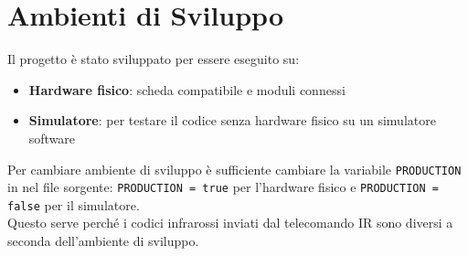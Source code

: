 \documentclass[a4paper, 12pt]{article}
\begin{document}
\section{Ambienti di Sviluppo}
Il progetto è stato sviluppato per essere eseguito su:
\begin{itemize}
    \item \textbf{Hardware fisico}: scheda compatibile e moduli connessi
    \item \textbf{Simulatore}: per testare il codice senza hardware fisico su un simulatore software
\end{itemize}
Per cambiare ambiente di sviluppo è sufficiente cambiare la variabile \texttt{PRODUCTION} in nel file sorgente: \texttt{PRODUCTION = true} per l'hardware fisico e \texttt{PRODUCTION = false} per il simulatore.\\
Questo serve perché i codici infrarossi inviati dal telecomando IR sono diversi a seconda dell'ambiente di sviluppo.\\
\end{document}
